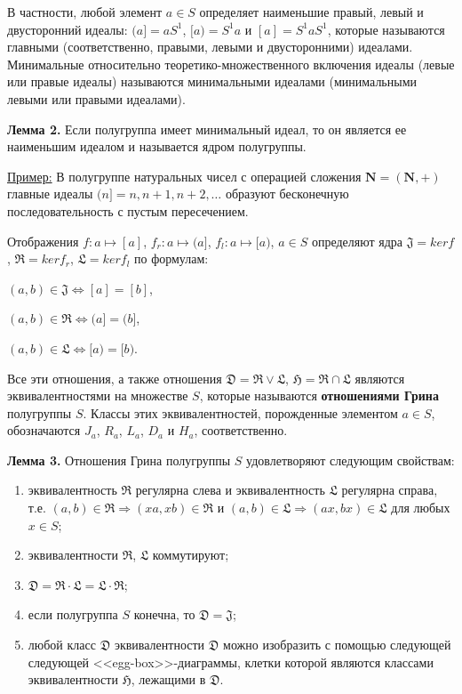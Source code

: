 \documentclass[bachelor, och, labwork]{shiza}
\begin{document}
    В частности, любой элемент $a \in S$ определяет наименьшие правый, левый и двусторонний идеалы: $(a] = aS^1$, $[a) = S^1a$ и
    $[a] = S^1aS^1$, которые называются главными (соответственно, правыми, левыми и двусторонними) идеалами.
    Минимальные относительно теоретико-множественного включения идеалы (левые или правые идеалы) называются минимальными идеалами
    (минимальными левыми или правыми идеалами).
    
    \textbf{Лемма 2.} Если полугруппа имеет минимальный идеал, то он является ее наименьшим идеалом и называется ядром полугруппы.

    \underline{Пример:} В полугруппе натуральных чисел с операцией сложения $\textbf{N} = (\textbf{N}, +)$ главные идеалы 
    $(n] = {n, n + 1, n + 2, \dots}$ образуют бесконечную последовательность с пустым пересечением.

    \begin{center}
      Отображения $f: a \mapsto [a]$, $f_r: a \mapsto (a]$, $f_l: a \mapsto [a)$, $a \in S$ определяют ядра $\mathfrak{J} = ker f$,
      $\mathfrak{R} = ker f_r$, $\mathfrak{L} = ker f_l$ по формулам:

      $(a, b) \in \mathfrak{J} \Longleftrightarrow [a] = [b]$,

      $(a, b) \in \mathfrak{R} \Longleftrightarrow (a] = (b]$,

      $(a, b) \in \mathfrak{L} \Longleftrightarrow [a) = [b)$.
    \end{center}

    Все эти отношения, а также отношения $\mathfrak{D}  = \mathfrak{R} \vee \mathfrak{L}$, $\mathfrak{H}  = \mathfrak{R} \cap \mathfrak{L}$
    являются эквивалентностями на множестве $S$, которые называются \textbf{отношениями Грина} полугруппы $S$. Классы этих эквивалентностей,
    порожденные элементом $a \in S$, обозначаются $J_a$, $R_a$, $L_a$, $D_a$ и $H_a$, соответственно.
  
    \textbf{Лемма 3.} Отношения Грина полугруппы $S$ удовлетворяют следующим свойствам:

    \begin{enumerate}
      \item эквивалентность $\mathfrak{R}$ регулярна слева и эквивалентность $\mathfrak{L}$ регулярна справа, т.е.
      $(a, b) \in \mathfrak{R} \Rightarrow (xa, xb) \in \mathfrak{R}$ и $(a, b) \in \mathfrak{L} \Rightarrow (ax, bx) \in \mathfrak{L}$ 
      для любых $x \in S$;
      \item эквивалентности $\mathfrak{R}$, $\mathfrak{L}$ коммутируют;
      \item $\mathfrak{D} = \mathfrak{R} \cdot \mathfrak{L} = \mathfrak{L} \cdot \mathfrak{R}$;
      \item если полугруппа $S$ конечна, то $\mathfrak{D} = \mathfrak{J}$;
      \item любой класс $\mathfrak{D}$ эквивалентности $\mathfrak{D}$ можно изобразить с помощью следующей следующей <<egg-box>>-диаграммы,
      клетки которой являются классами эквивалентности $\mathfrak{H}$, лежащими в $\mathfrak{D}$.
    \end{enumerate}
\end{document}
